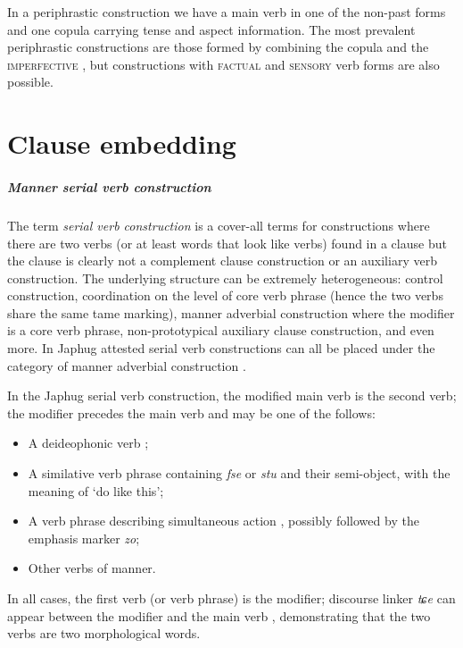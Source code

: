 \documentclass[a4paper, oneside, 12pt]{report}
\newcommand*{\citesec}[1]{\S~{#1}}
\newcommand*{\citepage}[1]{p.~{#1}}
\newcommand*{\term}[1]{\emph{#1}}
\newcommand{\form}[1]{\emph{#1}}
\newcommand{\category}[1]{\textsc{#1}}
\newcommand{\translate}[1]{`#1'}
\begin{document}
In a periphrastic construction we have a main verb in one of the non-past forms 
and one copula carrying tense and aspect information.
The most prevalent periphrastic constructions 
are those formed by combining the copula and the \category{imperfective} 
\citep[\citepage{1089}]{jacques2021grammar},
but constructions with \category{factual} \citep[\citesec{21.3.1.4}]{jacques2021grammar}
and \category{sensory} verb forms are also possible. 

\chapter{Clause embedding}

\paragraph*{Manner serial verb construction}

The term \term{serial verb construction} is a cover-all terms for constructions 
where there are two verbs (or at least words that look like verbs) found in a clause 
but the clause is clearly not a complement clause construction or an auxiliary verb construction.
The underlying structure can be extremely heterogeneous:
control construction, coordination on the level of core verb phrase 
(hence the two verbs share the same \ac{tame} marking), 
manner adverbial construction where the modifier is a core verb phrase, 
non-prototypical auxiliary clause construction, and even more.
In Japhug attested serial verb constructions can all be placed under the 
category of manner adverbial construction \citep[\citesec{25.4.1}]{jacques2021grammar}.

In the Japhug serial verb construction,
the modified main verb is the second verb; 
the modifier precedes the main verb and may be one of the follows:
\begin{itemize}
    \item A deideophonic verb \citep[\citesec{25.4.1.1}]{jacques2021grammar};
    \item A similative verb phrase containing \form{fse} or \form{stu} 
        and their semi-object, 
        with the meaning of \translate{do like this};
    \item A verb phrase describing simultaneous action \citep[\citesec{25.4.1.4}]{jacques2021grammar},
    possibly followed by the emphasis marker \form{zo};
    \item Other verbs of manner. 
\end{itemize}
In all cases, the first verb (or verb phrase) is the modifier; 
discourse linker \form{tɕe} can appear between the modifier and the main verb
\citep[\citepage{1408}, (73)]{jacques2021grammar}, 
demonstrating that the two verbs are two morphological words. 
\end{document}
